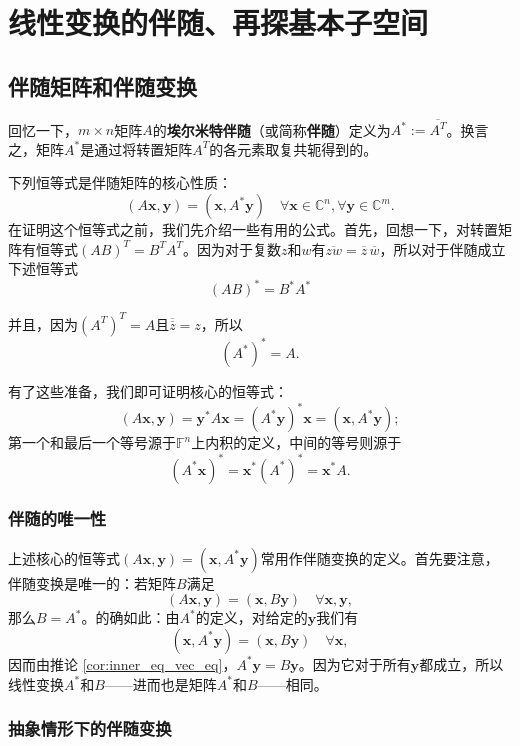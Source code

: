 \section{线性变换的伴随、再探基本子空间}

\subsection{伴随矩阵和伴随变换}

回忆一下，$m\times n$矩阵$A$的\textbf{埃尔米特伴随}（或简称\textbf{伴随}）定义为$A^*:=\overline{A^T}$。换言之，矩阵$A^*$是通过将转置矩阵$A^T$的各元素取复共轭得到的。

下列恒等式是伴随矩阵的核心性质：
\[\boxed{(A\mathbf{x},\mathbf{y})=(\mathbf{x},A^*\mathbf{y})\quad\forall\mathbf{x}\in\mathbb{C}^n,\forall\mathbf{y}\in\mathbb{C}^m.}\]
在证明这个恒等式之前，我们先介绍一些有用的公式。首先，回想一下，对转置矩阵有恒等式$(AB)^T=B^TA^T$。因为对于复数$z$和$w$有$\overline{zw}=\overline{z}\,\overline{w}$，所以对于伴随成立下述恒等式\[(AB)^*=B^*A^*\]

并且，因为$(A^T)^T=A$且$\overline{\overline{z}}=z$，所以\[(A^*)^*=A.\]

有了这些准备，我们即可证明核心的恒等式：
\[(A\mathbf{x},\mathbf{y})=\mathbf{y}^*A\mathbf{x}=(A^*\mathbf{y})^*\mathbf{x}=(\mathbf{x},A^*\mathbf{y});\]
第一个和最后一个等号源于$\mathbb{F}^n$上内积的定义，中间的等号则源于\[(A^*\mathbf{x})^*=\mathbf{x}^*(A^*)^*=\mathbf{x}^*A.\]

\subsubsection{伴随的唯一性}\label{subsubsec:adjoint_uniqueness}

上述核心的恒等式$(A\mathbf{x},\mathbf{y})=(\mathbf{x},A^*\mathbf{y})$常用作伴随变换的定义。首先要注意，伴随变换是唯一的：若矩阵$B$满足\[(A\mathbf{x},\mathbf{y})=(\mathbf{x},B\mathbf{y})\quad\forall\mathbf{x},\mathbf{y},\]
那么$B=A^*$。的确如此：由$A^*$的定义，对给定的$\mathbf{y}$我们有\[(\mathbf{x},A^*\mathbf{y})=(\mathbf{x},B\mathbf{y})\quad\forall\mathbf{x},\]
因而由推论 \ref{cor:inner_eq_vec_eq}，$A^*\mathbf{y}=B\mathbf{y}$。因为它对于所有$\mathbf{y}$都成立，所以线性变换$A^*$和$B$——进而也是矩阵$A^*$和$B$——相同。

\subsubsection{抽象情形下的伴随变换}

